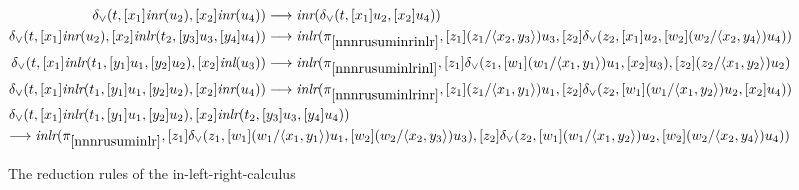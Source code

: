 \documentclass[screen, sigconf,authorversion,nonacm]{acmart}
\theoremstyle{acmdefinition}
\numberwithin{equation}{section}
\newcommand\abstr[1]{[#1]}
\newcommand\inl{\mbox{\it inl}}
\newcommand\inr{\mbox{\it inr}}
\newcommand\inlr{\mbox{\it inlr}}
\newcommand\elimor{\delta_{\vee}}
\newcommand\pair[2]{\langle #1, #2 \rangle}
\newcommand\lra{\longrightarrow}
\begin{document}
\begin{figure*}[!ht]
\begin{align}
    \elimor(t,\abstr{x_1} \inr(u_2), \abstr{x_2} \inr(u_4)) &\lra \inr (\elimor(t, \abstr{x_1} u_2, \abstr{x_2} u_4))\label{nnnrusuminrinr}
    \\
    \elimor(t,\abstr{x_1} \inr(u_2), \abstr{x_2} \inlr(t_2, \abstr{y_3}u_3,\abstr{y_4} u_4)) &\lra \inlr ( \pi_{\ref{nnnrusuminrinlr}}, \abstr{z_1} (z_1/\pair{x_2}{y_3})u_3, \abstr{z_2}\elimor(z_2, \abstr{x_1} u_2, \abstr{w_2} (w_2/\pair{x_2}{y_4})u_4)) \label{nnnrusuminrinlr}
    \\
    \elimor(t, \abstr{x_1} \inlr(t_1, \abstr{y_1}u_1,\abstr{y_2} u_2), \abstr{x_2} \inl(u_3)) &\lra \inlr ( \pi_{\ref{nnnrusuminlrinl}}, \abstr{z_1}\elimor(z_1, \abstr{w_1} (w_1/\langle x_1, y_1\rangle)u_1, \abstr{x_2} u_3), \abstr{z_2} (z_2/\langle x_1, y_2 \rangle)u_2) \label{nnnrusuminlrinl}
    \\
    \elimor(t, \abstr{x_1} \inlr(t_1, \abstr{y_1}u_1,\abstr{y_2} u_2), \abstr{x_2} \inr(u_4)) &\lra \inlr ( \pi_{\ref{nnnrusuminlrinr}}, \abstr{z_1} (z_1/\langle x_1, y_1 \rangle)u_1, \abstr{z_2}\elimor(z_2, \abstr{w_1} (w_1/\langle x_1, y_2\rangle)u_2, \abstr{x_2} u_4)) \label{nnnrusuminlrinr}
    \\
    \omit\rlap{$\elimor(t,\abstr{x_1} \inlr(t_1, \abstr{y_1}u_1,\abstr{y_2} u_2), \abstr{x_2} \inlr(t_2, \abstr{y_3}u_3,\abstr{y_4} u_4))$} \label{nnnrusuminlr}\\
    \omit\rlap{$\lra \inlr (\pi_{\ref{nnnrusuminlr}}, \abstr{z_1}\elimor(z_1, \abstr{w_1} (w_1/\pair{x_1}{y_1})u_1, \abstr{w_2} (w_2/\pair{x_2}{y_3})u_3), \abstr{z_2}\elimor(z_2, \abstr{w_1} (w_1/\pair{x_1}{y_2})u_2, \abstr{w_2} (w_2/\pair{x_2}{y_4})u_4))$} \nonumber
  \end{align}
  \caption{The reduction rules of the in-left-right-calculus\label{nnnfigureductionrules}}
\end{figure*}
\end{document}
